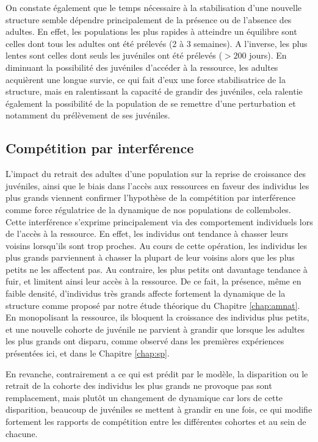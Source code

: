 On constate également que le temps nécessaire à la stabilisation d'une nouvelle
structure semble dépendre principalement de la présence ou de l'absence des
adultes. En effet, les populations les plus rapides à atteindre un équilibre
sont celles dont tous les adultes ont été prélevés (2 à 3 semaines).
A l'inverse, les plus lentes sont celles dont seuls les juvéniles ont été
prélevés ($>200$ jours). En diminuant la possibilité des juvéniles d'accéder à
la ressource, les adultes acquièrent une longue survie, ce qui fait d'eux une
force stabilisatrice de la structure, mais en ralentissant la capacité de
grandir des juvéniles, cela ralentie également la possibilité de la population
de se remettre d'une perturbation et notamment du prélèvement de ses juvéniles.

\subsection{Compétition par interférence}

L'impact du retrait des adultes d'une population sur la reprise de croissance
des juvéniles, ainsi que le biais dans l'accès aux ressources en faveur des
individus les plus grands viennent confirmer l'hypothèse de la compétition par
interférence comme force régulatrice de la dynamique de nos populations de
collemboles. Cette interférence s'exprime principalement via des comportement
individuels lors de l'accès à la ressource. En effet, les individus ont tendance
à chasser leurs voisins lorsqu'ils sont trop proches. Au cours de cette
opération, les individus les plus grands parviennent à chasser la plupart de leur voisins
alors que les plus petits ne les affectent pas. Au contraire, les plus petits
ont davantage tendance à fuir, et limitent ainsi leur accès à la ressource. De
ce fait, la présence, même en faible densité, d'individus très grands affecte
fortement la dynamique de la structure comme proposé par notre étude théorique
du Chapitre \ref{chap:amnat}. En monopolisant la ressource, ils bloquent la
croissance des individus plus petits, et une nouvelle cohorte de juvénile ne
parvient à grandir que lorsque les adultes les plus grands ont disparu, comme
observé dans les premières expériences présentées ici, et dans le Chapitre
\ref{chap:sp}.

En revanche, contrairement a ce qui est prédit par le modèle, la disparition
ou le retrait de la cohorte des individus les plus grands ne provoque pas sont
remplacement, mais plutôt un changement de dynamique car lors de cette
disparition, beaucoup de juvéniles se mettent à grandir en une fois, ce qui
modifie fortement les rapports de compétition entre les différentes cohortes et
au sein de chacune.

